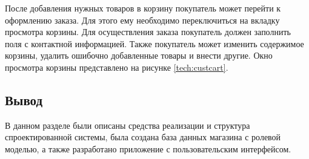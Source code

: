 После добавления нужных товаров в корзину покупатель может перейти к оформлению заказа. Для этого ему необходимо переключиться на вкладку просмотра корзины. Для осуществления заказа покупатель должен заполнить поля с контактной информацией. Также покупатель может изменить содержимое корзины, удалить ошибочно добавленные товары и внести другие. Окно просмотра корзины представлено на рисунке \ref{tech:custcart}.

\begin{figure}[H]
\end{figure}

\subsection*{Вывод}

В данном разделе были описаны средства реализации и структура спроектированной системы, была создана база данных магазина с ролевой моделью, а также разработано приложение с пользовательским интерфейсом.

\pagebreak